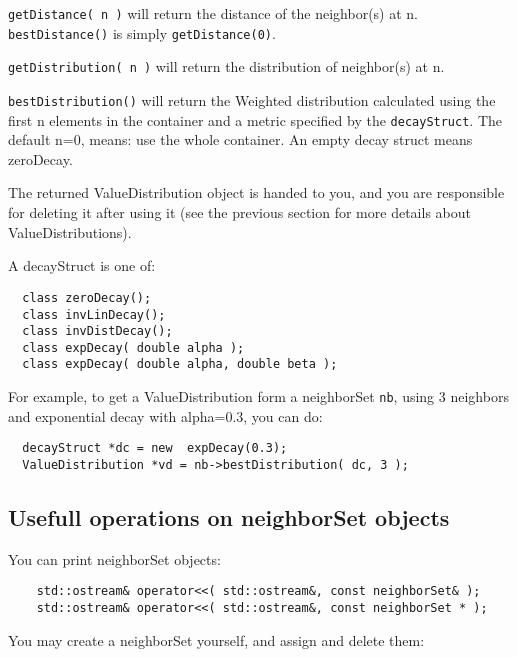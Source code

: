\documentclass{report}
\begin{document}
{\tt getDistance( n )} will return the distance of the neighbor(s) at n.
{\tt bestDistance()} is simply {\tt getDistance(0)}.

{\tt getDistribution( n )} will return the distribution of neighbor(s) at
n.

{\tt bestDistribution()} will return the Weighted distribution
calculated using the first n elements in the container and a metric
specified by the {\tt decayStruct}.  The default n=0, means: use the
whole container. An empty decay struct means zeroDecay.

The returned ValueDistribution object is handed to you, and you are
responsible for deleting it after using it (see the previous section
for more details about ValueDistributions).

A decayStruct is one of:

\begin{footnotesize}
\begin{verbatim}
  class zeroDecay();
  class invLinDecay();
  class invDistDecay();
  class expDecay( double alpha );
  class expDecay( double alpha, double beta );
\end{verbatim}
\end{footnotesize}
 
For example, to get a ValueDistribution form a neighborSet {\tt nb}, using
3 neighbors and exponential decay with alpha=0.3, you can do:

\begin{footnotesize}
\begin{verbatim}
  decayStruct *dc = new  expDecay(0.3);
  ValueDistribution *vd = nb->bestDistribution( dc, 3 );
\end{verbatim}
\end{footnotesize}


\subsection{Usefull operations on neighborSet objects}

You can print neighborSet objects:

\begin{footnotesize}
\begin{verbatim}
    std::ostream& operator<<( std::ostream&, const neighborSet& );
    std::ostream& operator<<( std::ostream&, const neighborSet * );
\end{verbatim}
\end{footnotesize}

You may create a neighborSet yourself, and assign and delete them:
\end{document}
